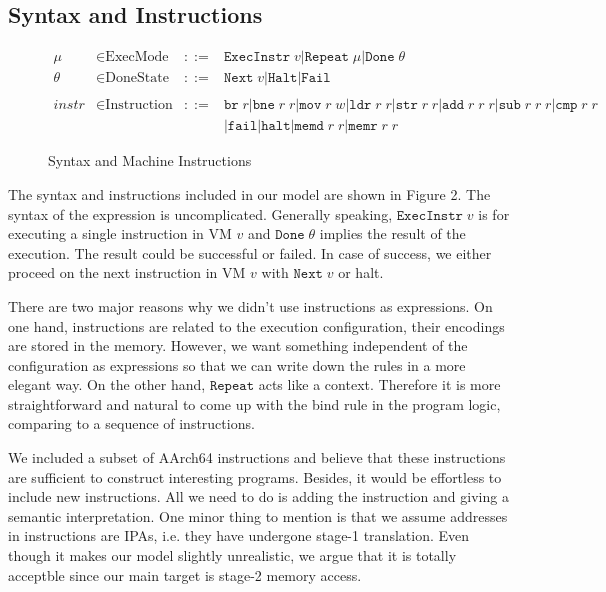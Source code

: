 \documentclass[a4paper]{article}
\newcommand*{\derived}{::=}
\newcommand*{\MODE}{\text{ExecMode}}
\newcommand*{\DONE}{\text{DoneState}}
\newcommand*{\INSTR}{\text{Instruction}}
\newcommand*{\instrm}[1]{\mathtt{#1}}
\newcommand*{\EI}[1]{\mathtt{ExecInstr} \; {#1}}
\newcommand*{\DN}[1]{\mathtt{Done} \; {#1}}
\newcommand*{\NXT}[1]{\mathtt{Next} \; {#1}}
\begin{document}
\subsection{Syntax and Instructions}
\begin{figure}[h!]
  \begin{align*}
    \mu &\in \MODE &\derived & \mathtt{ExecInstr} \; v | \mathtt{Repeat} \; \mu | \mathtt{Done} \; \theta \\
    \theta &\in \DONE &\derived & \NXT{v} | \mathtt{Halt} | \mathtt{Fail}\\
    \\
    instr & \in  \INSTR &\derived & \instrm{br} \; r |\instrm{bne} \; r \; r |
                                    \instrm{mov} \; r \; w | \instrm{ldr} \; r\; r|
                                    \instrm{str} \; r \; r | \instrm{add} \; r \; r \; r |
                                    \instrm{sub} \; r \; r \; r | \instrm{cmp} \; r \; r \\
        & & & | \instrm{fail} | \instrm{halt} | \instrm{memd} \; r \; r | \instrm{memr} \; r\; r
  \end{align*}
  \caption{Syntax and Machine Instructions}
\end{figure}

The syntax and instructions included in our model are shown in Figure 2. The
syntax of the expression is uncomplicated. Generally speaking, $\EI{v}$ is for
executing a single instruction in VM $v$ and $\DN{\theta}$ implies the result of
the execution. The result could be successful or failed. In case of success, we
either proceed on the next instruction in VM $v$ with $\NXT{v}$ or halt.

There are two major reasons why we didn't use instructions as expressions. On
one hand,
instructions are related to the execution configuration, their encodings are
stored in the memory. However, we want something independent of the
configuration as expressions so that we can write down the rules in a more
elegant way. On the other hand, $\mathtt{Repeat}$ acts like a context.
Therefore it is more straightforward and natural to come up with the bind rule
in the program logic, comparing to a sequence of instructions.


We included a subset of AArch64 instructions and believe that these instructions
are sufficient to construct interesting programs. Besides, it would be
effortless to include new instructions. All we need to do is adding the
instruction and giving a semantic interpretation. One minor thing to mention is
that we assume addresses in instructions are IPAs, i.e. they have undergone
stage-1 translation. Even though it makes our model slightly unrealistic, we argue
that it is totally acceptble since our main target is stage-2 memory access.
\end{document}
